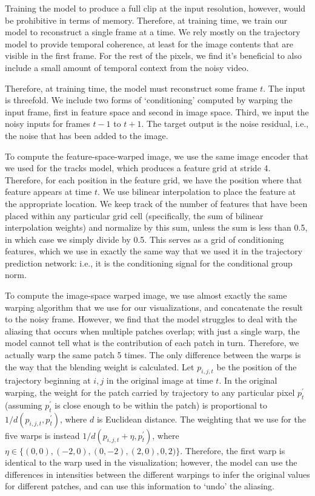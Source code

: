 \documentclass[10pt,twocolumn,letterpaper]{article}
\begin{document}
Training the model to produce a full clip at the input resolution, however, would be prohibitive in terms of memory.  Therefore, at training time, we train our model to reconstruct a single frame at a time.  We rely mostly on the trajectory model to provide temporal coherence, at least for the image contents that are visible in the first frame.  For the rest of the pixels, we find it's beneficial to also include a small amount of temporal context from the noisy video.  

Therefore, at training time, the model must reconstruct some frame $t$.  The input is threefold.  We include two forms of `conditioning' computed by warping the input frame, first in feature space and second in image space.  Third, we input the noisy inputs for frames $t-1$ to $t+1$.  The target output is the noise residual, i.e., the noise that has been added to the image.

To compute the feature-space-warped image, we use the same image encoder that we used for the tracks model, which produces a feature grid at stride 4.  Therefore, for each position in the feature grid, we have the position where that feature appears at time $t$.  We use bilinear interpolation to place the feature at the appropriate location.  We keep track of the number of features that have been placed within any particular grid cell (specifically, the sum of bilinear interpolation weights) and normalize by this sum, unless the sum is less than 0.5, in which case we simply divide by 0.5.  This serves as a grid of conditioning features, which we use in exactly the same way that we used it in the trajectory prediction network: i.e., it is the conditioning signal for the conditional group norm.

To compute the image-space warped image, we use almost exactly the same warping algorithm that we use for our visualizations, and concatenate the result to the noisy frame.  However, we find that the model struggles to deal with the aliasing that occurs when multiple patches overlap; with just a single warp, the model cannot tell what is the contribution of each patch in turn.  Therefore, we actually warp the same patch 5 times.  The only difference between the warps is the way that the blending weight is calculated.  Let $p_{i,j,t}$ be the position of the trajectory beginning at $i,j$ in the original image at time $t$.  In the original warping, the weight for the patch carried by trajectory to any particular pixel $p^{\prime}_{t}$ (assuming $p^{\prime}_{t}$ is close enough to be within the patch) is proportional to $1/d(p_{i,j,t},p^{\prime}_{t})$, where $d$ is Euclidean distance.  The weighting that we use for the five warps is instead $1/d(p_{i,j,t}+\eta,p^{\prime}_{t})$, where $\eta\in\{(0,0),(-2,0),(0,-2),(2,0),0,2)\}$.  Therefore, the first warp is identical to the warp used in the visualization; however, the model can use the differences in intensities between the different warpings to infer the original values for different patches, and can use this information to `undo' the aliasing.
\end{document}
